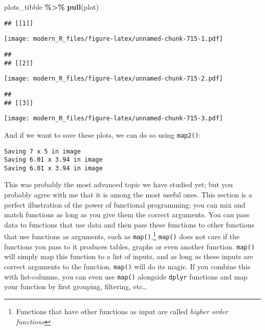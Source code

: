 \documentclass[
]{article}
\newenvironment{Shaded}{\begin{snugshade}}{\end{snugshade}}
\newcommand{\KeywordTok}[1]{\textcolor[rgb]{0.13,0.29,0.53}{\textbf{#1}}}
\newcommand{\NormalTok}[1]{#1}
\newcommand{\OperatorTok}[1]{\textcolor[rgb]{0.81,0.36,0.00}{\textbf{#1}}}
\newcommand{\StringTok}[1]{\textcolor[rgb]{0.31,0.60,0.02}{#1}}
\begin{document}
\begin{Shaded}
\begin{Highlighting}[]
\NormalTok{plots\_tibble }\OperatorTok{\%\textgreater{}\%}
\StringTok{  }\KeywordTok{pull}\NormalTok{(plot)}
\end{Highlighting}
\end{Shaded}

\begin{verbatim}
## [[1]]
\end{verbatim}

\texttt{[image: modern\_R\_files/figure-latex/unnamed-chunk-715-1.pdf]}

\begin{verbatim}
## 
## [[2]]
\end{verbatim}

\texttt{[image: modern\_R\_files/figure-latex/unnamed-chunk-715-2.pdf]}

\begin{verbatim}
## 
## [[3]]
\end{verbatim}

\texttt{[image: modern\_R\_files/figure-latex/unnamed-chunk-715-3.pdf]}

And if we want to save these plots, we can do so using \texttt{map2()}:

\begin{Shaded}
\end{Shaded}

\begin{verbatim}
Saving 7 x 5 in image
Saving 6.01 x 3.94 in image
Saving 6.01 x 3.94 in image
\end{verbatim}

This was probably the most advanced topic we have studied yet; but you probably agree with me that
it is among the most useful ones. This section is a perfect illustration of the power of functional
programming; you can mix and match functions as long as you give them the correct arguments.
You can pass data to functions that use data and then pass these functions to other functions that
use functions as arguments, such as \texttt{map()}.\footnote{Functions that have other functions as input are
  called \emph{higher order functions}} \texttt{map()} does not care if the functions you pass to it produces tables,
graphs or even another function. \texttt{map()} will simply map this function to a list of inputs, and as
long as these inputs are correct arguments to the function, \texttt{map()} will do its magic. If you
combine this with list-columns, you can even use \texttt{map()} alongside \texttt{dplyr} functions and map your
function by first grouping, filtering, etc\ldots{}
\end{document}
